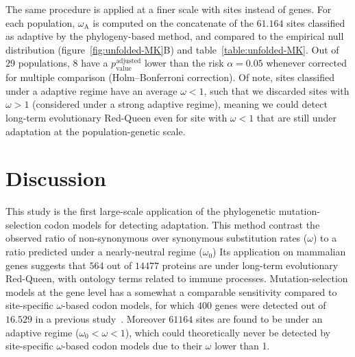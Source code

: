 \documentclass{article}
\begin{document}
The same procedure is applied at a finer scale with sites instead of genes.
For each population, $\omega_{\mathrm{A}}$ is computed on the concatenate of the $61.164$ sites classified as adaptive by the phylogeny-based method, and compared to the empirical null distribution (figure~\ref{fig:unfolded-MK}B) and table~\ref{table:unfolded-MK}.
Out of $29$ populations, $8$ have a $p_{\mathrm{value}}^{\mathrm{adjusted}}$ lower than the risk $\alpha=0.05$ whenever corrected for multiple comparison (Holm–Bonferroni correction).
Of note, sites classified under a adaptive regime have an average $\omega < 1$, such that we discarded sites with $\omega > 1$ (considered under a strong adaptive regime), meaning we could detect long-term evolutionary Red-Queen even for site with $\omega < 1$ that are still under adaptation at the population-genetic scale.

\section*{Discussion}

This study is the first large-scale application of the phylogenetic mutation-selection codon models for detecting adaptation.
This method contrast the observed ratio of non-synonymous over synonymous substitution rates ($\omega$) to a ratio predicted under a nearly-neutral regime ($\omega_{0}$)
Its application on mammalian genes suggests that $564$ out of $14477$ proteins are under long-term evolutionary Red-Queen, with ontology terms related to immune processes.
Mutation-selection models at the gene level has a somewhat a comparable sensitivity compared to site-specific $\omega$-based codon models, for which $400$ genes were detected out of $16.529$ in a previous study~\cite{kosiol_patterns_2008}.
Moreover $61164$ sites are found to be under an adaptive regime ($\omega_{0} < \omega< 1$), which could theoretically never be detected by site-specific $\omega$-based codon models due to their $\omega$ lower than 1.
\end{document}
